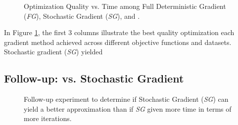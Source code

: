 \begin{figure}
\centerline{}
\caption[Optimization Quality among gradient methods]{Optimization Quality vs. Time among Full Deterministic Gradient (\emph{FG}), Stochastic Gradient (\emph{SG}), and \tool.}
\label{table:approx}
\end{figure}


In Figure \ref{table:approx}, the first 3 columns illustrate the best quality optimization each gradient method achieved across different objective functions and datasets.  
Stochastic gradient (\emph{SG}) yielded 



\subsection{Follow-up: \tool vs. Stochastic Gradient}

\begin{figure}
\centerline{}
\caption[Follow-up Experiment]{Follow-up experiment to determine if Stochastic Gradient (\emph{SG}) can yield a better approximation than \tool if \emph{SG} given more time in terms of more iterations.}
\label{table:followup}
\end{figure}



